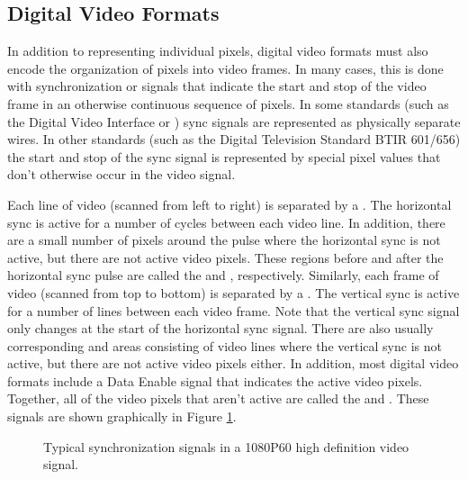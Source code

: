 \subsection{Digital Video Formats}
\label{sec:video:formats}

In addition to representing individual pixels, digital video formats must also encode the organization of pixels into video frames.  In many cases, this is done with synchronization or  signals that indicate the start and stop of the video frame in an otherwise continuous sequence of pixels.  In some standards (such as the Digital Video Interface or ) sync signals are represented as physically separate wires.  In other standards (such as the Digital Television Standard BTIR 601/656) the start and stop of the sync signal is represented by special pixel values that don't otherwise occur in the video signal.

Each line of video (scanned from left to right) is separated by a .  The horizontal sync is active for a number of cycles between each video line.  In addition, there are a small number of pixels around the pulse where the horizontal sync is not active, but there are not active video pixels.  These regions before and after the horizontal sync pulse are called the  and , respectively.  Similarly, each frame of video (scanned from top to bottom) is separated by a .  The vertical sync is active for a number of lines between each video frame.  Note that the vertical sync signal only changes at the start of the horizontal sync signal.  There are also usually corresponding  and  areas consisting of video lines where the vertical sync is not active, but there are not active video pixels either.  In addition, most digital video formats include a Data Enable signal that indicates the active video pixels.  Together, all of the video pixels that aren't active are called the 
 and .  These signals are shown graphically in Figure \ref{fig:video_syncs}.

\begin{figure}
\centering

\caption{Typical synchronization signals in a 1080P60 high definition video signal.}\label{fig:video_syncs}
\end{figure}


